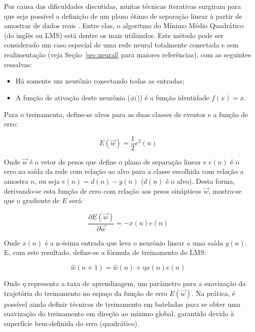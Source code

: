 Por causa das dificuldades discutidas, muitas técnicas iterativas surgiram
para que seja possível a definição de um plano ótimo de separação linear à
partir de amostras de dados reais \cite{haykin}. Entre elas, o algoritmo do
Mínimo Médio Quadrático (do inglês  ou LMS) está dentre
os mais utilizados. Este método pode ser considerado um caso especial de uma
rede neural totalmente conectada e sem realimentação (veja
Seção~\ref{sec:neural} para maiores referências), com as seguintes ressalvas:

\begin{itemize}
\item Há somente um neurônio conectando todas as entradas;
\item A função de ativação deste neurônio ($\phi(\dot)$) é a função identidade
$f(x) = x$.
\end{itemize}

Para o treinamento, define-se alvos para as duas classes de eventos e a função
de erro:

\begin{equation}
E(\overrightarrow{w}) = \frac{1}{2} e^2(n)
\end{equation}

Onde $\overrightarrow{w}$ é o vetor de pesos que define o plano de separação
linear e $e(n)$ é o erro na saída da rede com relação ao alvo para a classe
escolhida com relação a amostra $n$, ou seja $e(n) = d(n)-y(n)$ ($d(n)$ é o
alvo). Desta forma, derivando-se esta função de erro com relação aos pesos
sinápticos $\overrightarrow{w}$, mostra-se que o gradiente de $E$ será:

\begin{equation}
\frac{\partial E(\overrightarrow{w})}{\partial \overrightarrow{w}} =
-x(n)e(n) 
\end{equation}

Onde $x(n)$ é a n-ésima entrada que leva o neurônio linear a uma saída
$y(n)$. E, com este resultado, define-se a fórmula de treinamento do LMS:

\begin{equation}
\hat{w}(n+1) = \hat{w}(n) + \eta x(n)e(n)
\label{eq:lms}
\end{equation}

Onde $\eta$ representa a taxa de aprendizagem, um parâmetro para a suavização
da trajetória do treinamento no espaço da função de erro
$E(\overrightarrow{w})$. Na prática, é possível ainda definir técnicas de
treinamento em bateladas para se obter uma suavização do treinamento em
direção ao mínimo global, garantido devido à superfície bem-definida do erro
(quadrático).

